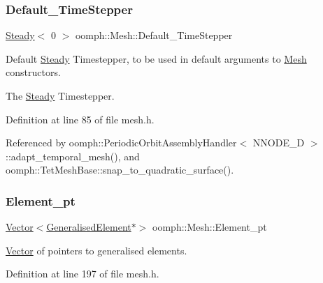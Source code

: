 \subsubsection{\texorpdfstring{Default\+\_\+\+Time\+Stepper}{Default\_TimeStepper}}
{\footnotesize\ttfamily \hyperlink{classoomph_1_1Steady}{Steady}$<$ 0 $>$ oomph\+::\+Mesh\+::\+Default\+\_\+\+Time\+Stepper\hspace{0.3cm}{\ttfamily [static]}}



Default \hyperlink{classoomph_1_1Steady}{Steady} Timestepper, to be used in default arguments to \hyperlink{classoomph_1_1Mesh}{Mesh} constructors. 

The \hyperlink{classoomph_1_1Steady}{Steady} Timestepper. 

Definition at line 85 of file mesh.\+h.



Referenced by oomph\+::\+Periodic\+Orbit\+Assembly\+Handler$<$ N\+N\+O\+D\+E\+\_\+D $>$\+::adapt\+\_\+temporal\+\_\+mesh(), and oomph\+::\+Tet\+Mesh\+Base\+::snap\+\_\+to\+\_\+quadratic\+\_\+surface().

\mbox{\label{classoomph_1_1Mesh_aca12acfe655a4d5c4a4eab4a7b970812}} 
\subsubsection{\texorpdfstring{Element\+\_\+pt}{Element\_pt}}
{\footnotesize\ttfamily \hyperlink{classoomph_1_1Vector}{Vector}$<$\hyperlink{classoomph_1_1GeneralisedElement}{Generalised\+Element}$\ast$$>$ oomph\+::\+Mesh\+::\+Element\+\_\+pt\hspace{0.3cm}{\ttfamily [protected]}}



\hyperlink{classoomph_1_1Vector}{Vector} of pointers to generalised elements. 



Definition at line 197 of file mesh.\+h.



